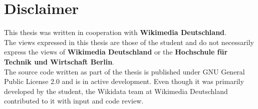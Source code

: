 \chapter{Disclaimer}

This thesis was written in cooperation with \textbf{Wikimedia Deutschland}. \\
The views expressed in this thesis are those of the student and do not necessarily express the views of \textbf{Wikimedia Deutschland} or the \textbf{Hochschule für Technik und Wirtschaft Berlin}. \\
The source code written as part of the thesis is published under GNU General Public License 2.0 and is in active development. Even though it was primarily developed by the student, the Wikidata team at Wikimedia Deutschland contributed to it with input and code review.

